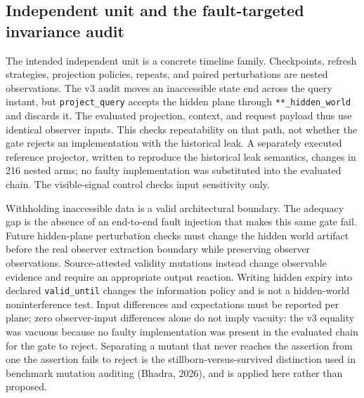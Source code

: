 \documentclass[11pt]{article}
\begin{document}
\subsection{Independent unit and the fault-targeted invariance audit}
The intended independent unit is a concrete timeline family. Checkpoints, refresh strategies, projection policies, repeats, and paired perturbations are nested observations. The v3 audit moves an inaccessible state end across the query instant, but \texttt{project\_query} accepts the hidden plane through \texttt{**\_hidden\_world} and discards it. The evaluated projection, context, and request payload thus use identical observer inputs. This checks repeatability on that path, not whether the gate rejects an implementation with the historical leak. A separately executed reference projector, written to reproduce the historical leak semantics, changes in 216 nested arms; no faulty implementation was substituted into the evaluated chain. The visible-signal control checks input sensitivity only.

Withholding inaccessible data is a valid architectural boundary. The adequacy gap is the absence of an end-to-end fault injection that makes this same gate fail. Future hidden-plane perturbation checks must change the hidden world artifact before the real observer extraction boundary while preserving observer observations. Source-attested validity mutations instead change observable evidence and require an appropriate output reaction. Writing hidden expiry into declared \texttt{valid\_until} changes the information policy and is not a hidden-world noninterference test. Input differences and expectations must be reported per plane; zero observer-input differences alone do not imply vacuity: the v3 equality was vacuous because no faulty implementation was present in the evaluated chain for the gate to reject. Separating a mutant that never reaches the assertion from one the assertion fails to reject is the stillborn-versus-survived distinction used in benchmark mutation auditing (Bhadra, 2026), and is applied here rather than proposed.
\end{document}
